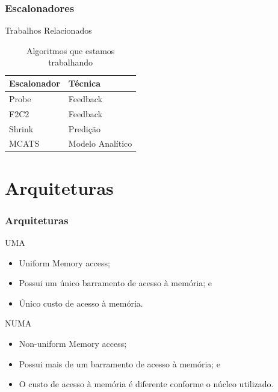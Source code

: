 \documentclass[10pt, pdf,xcolor=pdftex,dvipsnames,table]{beamer}
\begin{document}
\begin{frame} \frametitle{Escalonadores}
\begin{block}{Trabalhos Relacionados}
\begin{table}[]
\footnotesize
\centering
\caption{Algoritmos que estamos trabalhando}
\label{tab:compare}
\begin{tabular}{l|l}
\hline
Escalonador & Técnica \\ \hline
Probe & Feedback \\
F2C2 & Feedback \\
Shrink & Predição \\
MCATS & Modelo Analítico \\
\hline
\end{tabular}
\end{table}
\end{block}
\end{frame}


\section{Arquiteturas}
\begin{frame} \frametitle{Arquiteturas}
\begin{block}{UMA}
\begin{itemize}
	\item Uniform Memory access;
	\item Possui um único barramento de acesso à memória; e
	\item Único custo de acesso à memória.
\end{itemize}
\end{block}
\begin{block}{NUMA}
\begin{itemize}
	\item Non-uniform Memory access;
	\item Possui mais de um barramento de acesso à memória; e
	\item O custo de acesso à memória é diferente conforme o núcleo utilizado.
\end{itemize}
\end{block}
\end{frame}
\end{document}
